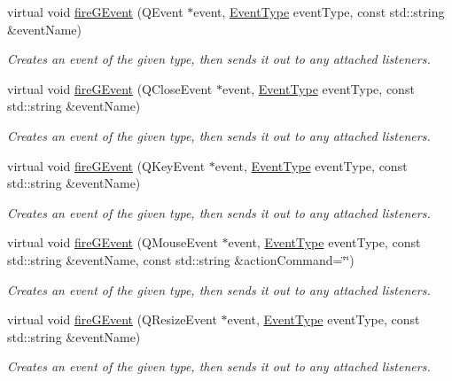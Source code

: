 \begin{DoxyCompactItemize}
virtual void \mbox{\hyperlink{classsgl_1_1GObservable_ab3983ea07337b52020a29cc00c653d8d}{fire\+G\+Event}} (Q\+Event $\ast$event, \mbox{\hyperlink{namespacesgl_a2628ea8d12e8b2563c32f05dc7fff6fa}{Event\+Type}} event\+Type, const std\+::string \&event\+Name)
\begin{DoxyCompactList}\small\item\em Creates an event of the given type, then sends it out to any attached listeners. \end{DoxyCompactList}\item 
virtual void \mbox{\hyperlink{classsgl_1_1GObservable_a01fdf1b0e0dbd49e189fe4514e010411}{fire\+G\+Event}} (Q\+Close\+Event $\ast$event, \mbox{\hyperlink{namespacesgl_a2628ea8d12e8b2563c32f05dc7fff6fa}{Event\+Type}} event\+Type, const std\+::string \&event\+Name)
\begin{DoxyCompactList}\small\item\em Creates an event of the given type, then sends it out to any attached listeners. \end{DoxyCompactList}\item 
virtual void \mbox{\hyperlink{classsgl_1_1GObservable_abb0b2f66ba39211cb5d7615e9d1c04e2}{fire\+G\+Event}} (Q\+Key\+Event $\ast$event, \mbox{\hyperlink{namespacesgl_a2628ea8d12e8b2563c32f05dc7fff6fa}{Event\+Type}} event\+Type, const std\+::string \&event\+Name)
\begin{DoxyCompactList}\small\item\em Creates an event of the given type, then sends it out to any attached listeners. \end{DoxyCompactList}\item 
virtual void \mbox{\hyperlink{classsgl_1_1GObservable_a119318675d2165bdf7dd853aaf881d4b}{fire\+G\+Event}} (Q\+Mouse\+Event $\ast$event, \mbox{\hyperlink{namespacesgl_a2628ea8d12e8b2563c32f05dc7fff6fa}{Event\+Type}} event\+Type, const std\+::string \&event\+Name, const std\+::string \&action\+Command=\char`\"{}\char`\"{})
\begin{DoxyCompactList}\small\item\em Creates an event of the given type, then sends it out to any attached listeners. \end{DoxyCompactList}\item 
virtual void \mbox{\hyperlink{classsgl_1_1GObservable_a63fd9034e1e1633c1c38eb342bfd34e9}{fire\+G\+Event}} (Q\+Resize\+Event $\ast$event, \mbox{\hyperlink{namespacesgl_a2628ea8d12e8b2563c32f05dc7fff6fa}{Event\+Type}} event\+Type, const std\+::string \&event\+Name)
\begin{DoxyCompactList}\small\item\em Creates an event of the given type, then sends it out to any attached listeners. \end{DoxyCompactList}\item 

\end{DoxyCompactItemize}
